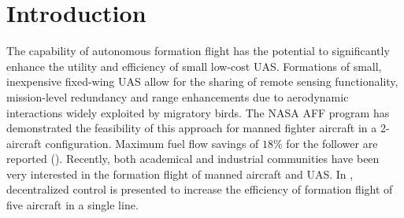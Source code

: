 \documentclass{ifacconf}
\begin{document}
\section{Introduction}
The capability of autonomous formation flight has the potential to significantly enhance the utility and efficiency of small low-cost UAS. 
Formations of small, inexpensive fixed-wing UAS allow for the sharing of remote sensing functionality, mission-level redundancy and range enhancements due to aerodynamic 
interactions widely exploited by migratory birds. 
The NASA AFF program has demonstrated the feasibility of this approach for manned fighter aircraft in a 2-aircraft configuration. Maximum fuel flow savings of $18\%$ for the follower are reported (\cite{Vachon2002}). 
Recently, both academical and industrial communities have been very interested in the formation flight of manned aircraft and UAS. In \cite{wolfe1996decentralized}, decentralized control is presented to increase the efficiency of formation flight of five aircraft in a single line.
\end{document}
